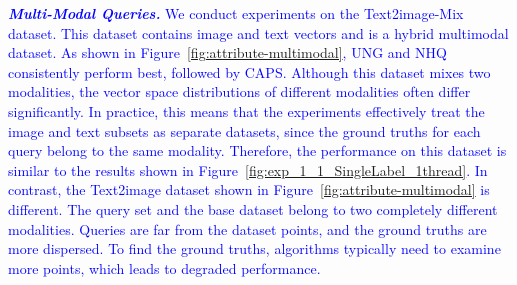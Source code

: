 \documentclass[sigconf, nonacm]{acmart}
\begin{document}
{%
	\textit{\textbf{\textcolor{blue}{Multi-Modal Queries.}}} \textcolor{blue}{
		We conduct experiments on the Text2image-Mix dataset. This dataset contains image and text vectors and is a hybrid multimodal dataset. As shown in Figure~\ref{fig:attribute-multimodal}, UNG and NHQ consistently perform best, followed by CAPS.
		Although this dataset mixes two modalities, the vector space distributions of different modalities often differ significantly. In practice, this means that the experiments effectively treat the image and text subsets as separate datasets, since the ground truths for each query belong to the same modality. Therefore, the performance on this dataset is similar to the results shown in Figure~\ref{fig:exp_1_1_SingleLabel_1thread}.
		In contrast, the Text2image dataset shown in Figure~\ref{fig:attribute-multimodal} is different. The query set and the base dataset belong to two completely different modalities. Queries are far from the dataset points, and the ground truths are more dispersed. To find the ground truths, algorithms typically need to examine more points, which leads to degraded performance.
}}
\end{document}
